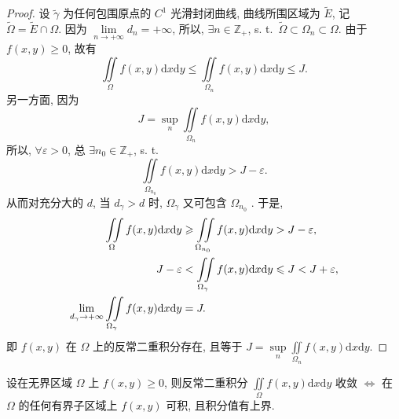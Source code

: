\begin{proof}
设 $\tilde{\gamma}$ 为任何包围原点的 $C^{1}$ 光滑封闭曲线, 曲线所围区域为 $\widetilde{E}$,
记 $\widetilde{\Omega} = \widetilde{E} \cap \Omega$.
因为 $\lim\limits_{n \to +\infty} d_{n} = +\infty$,
所以, $\exists n \in \mathbb{Z}_{+}$, s. t.\ $\widetilde{\Omega} \subset \Omega_{n} \subset \Omega$.
由于 $f(x, y) \geqslant 0$, 故有
\[
\iint\limits_{\Omega} f(x,y) \mathrm{d}x\mathrm{d}y
\leqslant \iint\limits_{\Omega_{n}} f(x,y) \mathrm{d}x\mathrm{d}y
\leqslant J.
\]
另一方面, 因为
\[
J = \sup\limits_{n} \iint\limits_{\Omega_{n}} f(x,y) \mathrm{d}x\mathrm{d}y,
\]
所以, $\forall \varepsilon > 0$, 总 $\exists n_{0} \in \mathbb{Z}_{+}$, s. t.\
\[
\iint\limits_{\Omega_{n_{0}}} f(x,y) \mathrm{d}x\mathrm{d}y > J - \varepsilon.
\]
从而对充分大的 $d$, 当 $d_{\gamma} > d$ 时, $\Omega_{\gamma}$ 又可包含 $\Omega_{n_{0}}$ .
于是,
\[
\begin{aligned}
\iint\limits_{\Omega} f(x,y) \mathrm{d}x\mathrm{d}y
&\geqslant \iint\limits_{\Omega_{n_{0}}} f(x,y) \mathrm{d}x\mathrm{d}y > J - \varepsilon, \notag\\
J - \varepsilon &< \iint\limits_{\Omega_{\gamma}} f(x,y) \mathrm{d}x\mathrm{d}y
\leqslant J < J + \varepsilon, \notag\\
\lim_{d_{\gamma} \to +\infty} \iint\limits_{\Omega_{\gamma}} f(x,y) \mathrm{d}x\mathrm{d}y &= J. \notag
\end{aligned}
\]
即 $f(x, y)$ 在 $\Omega$ 上的反常二重积分存在, 且等于
$J = \sup\limits_{n} \iint\limits_{\Omega_{n}} f(x,y) \mathrm{d}x\mathrm{d}y$.
\end{proof}

\begin{theorem}\label{thm:10.6.2}
设在无界区域 $\Omega$ 上 $f(x, y) \geqslant 0$, 则反常二重积分
$\iint\limits_{\Omega} f(x,y) \mathrm{d}x\mathrm{d}y$ 收敛
$\Leftrightarrow$ 在 $\Omega$ 的任何有界子区域上 $f(x, y)$ 可积, 且积分值有上界.
\end{theorem}

